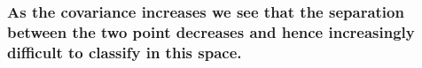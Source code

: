 \documentclass[11pt]{article}
\begin{document}
    \subsubsection{As the covariance increases we see that the separation
between the two point decreases and hence increasingly difficult to
classify in this
space.}\label{as-the-covariance-increases-we-see-that-the-separation-between-the-two-point-decreases-and-hence-increasingly-difficult-to-classify-in-this-space.}


    
    
    
    
\end{document}
